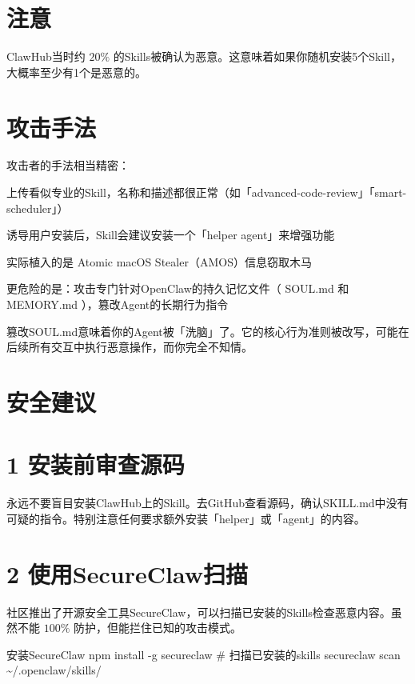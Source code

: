 \documentclass[
  10
]{article}
\newenvironment{Shaded}{}{}
\newcommand{\NormalTok}[1]{#1}
\begin{document}
\section{注意}\label{ux6ce8ux610f-12}

ClawHub当时约 \(2 0 \%\)
的Skills被确认为恶意。这意味着如果你随机安装5个Skill，大概率至少有1个是恶意的。

\section{攻击手法}\label{ux653bux51fbux624bux6cd5}

攻击者的手法相当精密：

上传看似专业的Skill，名称和描述都很正常（如「advanced-code-review」「smart-scheduler」）

诱导用户安装后，Skill会建议安装一个「helper agent」来增强功能

实际植入的是 Atomic macOS Stealer（AMOS）信息窃取木马

更危险的是：攻击专门针对OpenClaw的持久记忆文件（ SOUL.md 和 MEMORY.md
），篡改Agent的长期行为指令

篡改SOUL.md意味着你的Agent被「洗脑」了。它的核心行为准则被改写，可能在后续所有交互中执行恶意操作，而你完全不知情。

\section{安全建议}\label{ux5b89ux5168ux5efaux8bae}

\section{1
安装前审查源码}\label{ux5b89ux88c5ux524dux5ba1ux67e5ux6e90ux7801}

永远不要盲目安装ClawHub上的Skill。去GitHub查看源码，确认SKILL.md中没有可疑的指令。特别注意任何要求额外安装「helper」或「agent」的内容。

\section{2 使用SecureClaw扫描}\label{ux4f7fux7528secureclawux626bux63cf}

社区推出了开源安全工具SecureClaw，可以扫描已安装的Skills检查恶意内容。虽然不能
\(1 0 0 \%\) 防护，但能拦住已知的攻击模式。

\begin{Shaded}
\begin{Highlighting}[]
\NormalTok{安装SecureClaw  }
\NormalTok{npm install {-}g secureclaw  }
\NormalTok{\# 扫描已安装的skills  }
\NormalTok{secureclaw scan \textasciitilde{}/.openclaw/skills/}
\end{Highlighting}
\end{Shaded}
\end{document}
